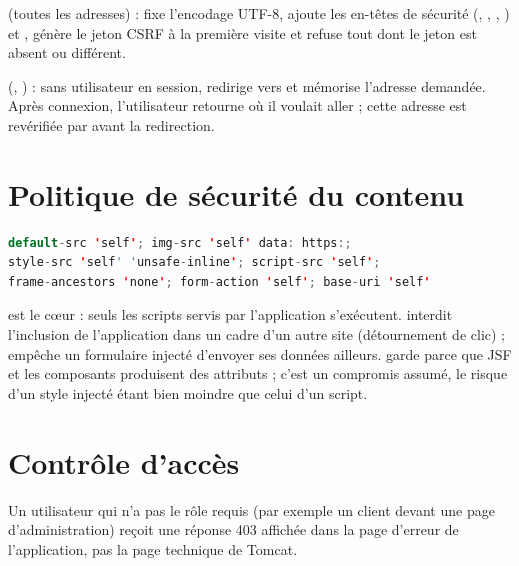\textbf{} (toutes les adresses) : fixe l'encodage UTF-8, ajoute les en-têtes de sécurité
(, , , ) et , génère le jeton CSRF à la
première visite et refuse tout  dont le jeton est absent ou différent.

\textbf{} (, ) : sans utilisateur en session, redirige vers
 et mémorise l'adresse demandée. Après connexion, l'utilisateur retourne où il voulait aller ; cette adresse
est revérifiée par  avant la redirection.

\section{Politique de sécurité du contenu}
\begin{lstlisting}[language=Java,caption={Politique appliquée à toutes les réponses},label={lst:csp}]
default-src 'self'; img-src 'self' data: https:;
style-src 'self' 'unsafe-inline'; script-src 'self';
frame-ancestors 'none'; form-action 'self'; base-uri 'self'
\end{lstlisting}

 est le c\oe{}ur : seuls les scripts servis par l'application s'exécutent. 
interdit l'inclusion de l'application dans un cadre d'un autre site (détournement de clic) ;  empêche un
formulaire injecté d'envoyer ses données ailleurs.  garde  parce que JSF et les
composants produisent des attributs  ; c'est un compromis assumé, le risque d'un style injecté étant bien
moindre que celui d'un script.

\section{Contrôle d'accès}
Un utilisateur qui n'a pas le rôle requis (par exemple un client devant une page d'administration) reçoit une réponse 403 affichée dans la page d'erreur de
l'application, pas la page technique de Tomcat.

